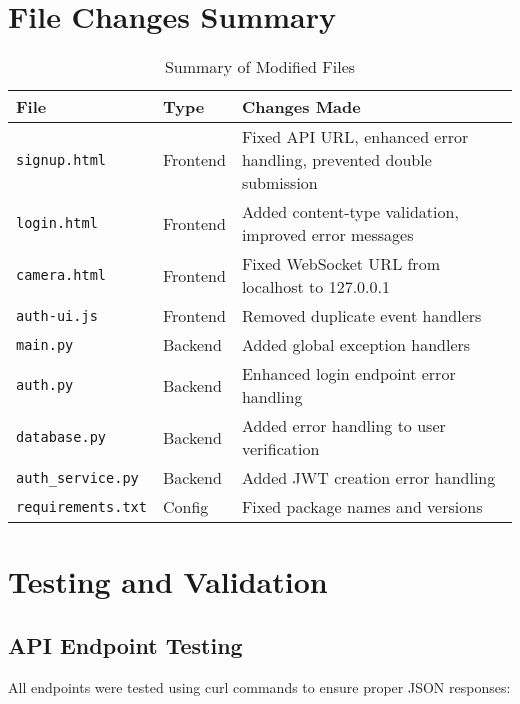 \documentclass[12pt,a4paper]{article}
\begin{document}
\section{File Changes Summary}

\begin{table}[h]
\centering
\begin{tabular}{|l|l|p{8cm}|}
\hline
\textbf{File} & \textbf{Type} & \textbf{Changes Made} \\
\hline
\texttt{signup.html} & Frontend & Fixed API URL, enhanced error handling, prevented double submission \\
\hline
\texttt{login.html} & Frontend & Added content-type validation, improved error messages \\
\hline
\texttt{camera.html} & Frontend & Fixed WebSocket URL from localhost to 127.0.0.1 \\
\hline
\texttt{auth-ui.js} & Frontend & Removed duplicate event handlers \\
\hline
\texttt{main.py} & Backend & Added global exception handlers \\
\hline
\texttt{auth.py} & Backend & Enhanced login endpoint error handling \\
\hline
\texttt{database.py} & Backend & Added error handling to user verification \\
\hline
\texttt{auth\_service.py} & Backend & Added JWT creation error handling \\
\hline
\texttt{requirements.txt} & Config & Fixed package names and versions \\
\hline
\end{tabular}
\caption{Summary of Modified Files}
\end{table}

\section{Testing and Validation}

\subsection{API Endpoint Testing}
All endpoints were tested using curl commands to ensure proper JSON responses:
\end{document}
